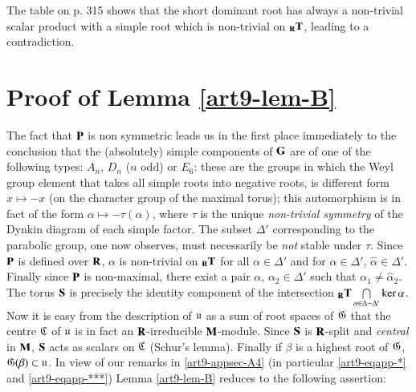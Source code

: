 The table on p. 315 shows that the short dominant root has always a non-trivial scalar product with a simple root which is non-trivial on ${}_{\mathbf{R}} \mathbf{T}$, leading to a contradiction.
 
\section{Proof of Lemma \ref{art9-lem-B}}%
The fact that $\mathbf{P}$ is non symmetric leads us in the first place immediately to the conclusion that the (absolutely) simple components of $\mathbf{G}$ are of one of the following types: $A_n$, $D_n$ ($n$ odd) or $E_6$: these are the groups in which the Weyl group element that takes all simple roots into negative roots, is different form $x \longmapsto -x$ (on the character group of the maximal torus); this automorphism is in fact of the form $\alpha \longmapsto - \tau (\alpha)$, where $\tau$ is the unique \textit{non-trivial symmetry} of the Dynkin diagram of each simple factor. The subset $\Delta'$ corresponding to the parabolic group, one now observes, must necessarily be \textit{not} stable under $\tau$. Since $\mathbf{P}$ is defined over $\mathbf{R}$, $\alpha$ is non-trivial on ${}_{\mathbf{R}}\mathbf{T}$ for all $\alpha \in \Delta'$ and for $\alpha \in \Delta'$, $\hat{\alpha} \in \Delta'$. Finally since $\mathbf{P}$ is non-maximal, there exist a pair $\alpha$, $\alpha_2 \in \Delta'$ such that $\alpha_1 \neq \hat{\alpha}_2$. The torus $\mathbf{S}$ is precisely the identity component of the intersection ${}_{\mathbf{R}} \mathbf{T} \bigcap\limits_{\alpha \in \Delta - \Delta'} \ker \alpha$. Now it is easy from the description of $\mathfrak{u}$ as a sum of root spaces of $\mathfrak{G}$ that the centre $\mathfrak{C}$ of $\mathfrak{u}$ is in fact an $\mathbf{R}$-irreducible $\mathbf{M}$-module. Since $\mathbf{S}$ is $\mathbf{R}$-split and \textit{central} in $\mathbf{M}$, $\mathbf{S}$ acts as scalars on $\mathfrak{C}$ (Schur's lemma). Finally if $\beta$ is a highest root of $\mathfrak{G}$, $\mathfrak{G} (\beta) \subset \mathfrak{u}$. In view of our remarks in \ref{art9-appsec-A4} (in particular \ref{art9-eqapp-*} and \ref{art9-eqapp-***}) Lemma \ref{art9-lem-B} reduces to the following assertion:

